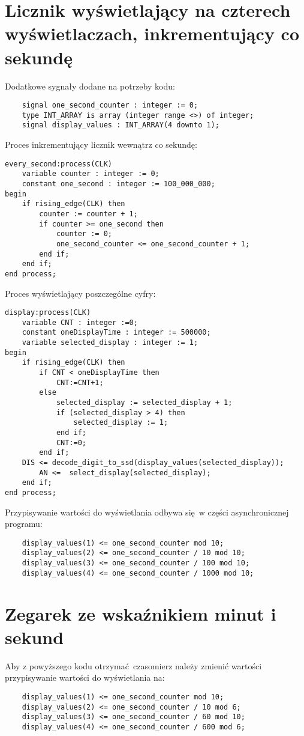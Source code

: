 \documentclass[a4paper, 12pt, titlepage]{article}
\begin{document}
	\section{Licznik wyświetlający na czterech wyświetlaczach, inkrementujący co sekundę}
	Dodatkowe sygnały dodane na potrzeby kodu:
\begin{lstlisting}
	signal one_second_counter : integer := 0;
	type INT_ARRAY is array (integer range <>) of integer;
	signal display_values : INT_ARRAY(4 downto 1);
\end{lstlisting}
	Proces inkrementujący licznik wewnątrz co sekundę:
\begin{lstlisting}
every_second:process(CLK)
	variable counter : integer := 0;
	constant one_second : integer := 100_000_000;
begin
	if rising_edge(CLK) then
		counter := counter + 1;
		if counter >= one_second then
			counter := 0;
			one_second_counter <= one_second_counter + 1;
		end if;
	end if; 
end process;
\end{lstlisting}
	Proces wyświetlający poszczególne cyfry:
\begin{lstlisting}
display:process(CLK)
	variable CNT : integer :=0;
	constant oneDisplayTime : integer := 500000;
	variable selected_display : integer := 1;
begin      
	if rising_edge(CLK) then
		if CNT < oneDisplayTime then
			CNT:=CNT+1;
		else 
			selected_display := selected_display + 1;
			if (selected_display > 4) then
				selected_display := 1;
			end if; 
			CNT:=0;
		end if;
	DIS <= decode_digit_to_ssd(display_values(selected_display));
		AN <=  select_display(selected_display);
	end if;
end process;
\end{lstlisting}
	\newpage\noindent
	Przypisywanie wartości do wyświetlania odbywa się w części asynchronicznej programu:
\begin{lstlisting}
	display_values(1) <= one_second_counter mod 10;
	display_values(2) <= one_second_counter / 10 mod 10;
	display_values(3) <= one_second_counter / 100 mod 10;
	display_values(4) <= one_second_counter / 1000 mod 10;
\end{lstlisting}
\section{Zegarek ze wskaźnikiem minut i sekund}
	Aby z powyższego kodu otrzymać czasomierz należy zmienić wartości przypisywanie wartości do wyświetlania na:
\begin{lstlisting}
	display_values(1) <= one_second_counter mod 10;
	display_values(2) <= one_second_counter / 10 mod 6;
	display_values(3) <= one_second_counter / 60 mod 10;
	display_values(4) <= one_second_counter / 600 mod 6;
\end{lstlisting}
\end{document}
